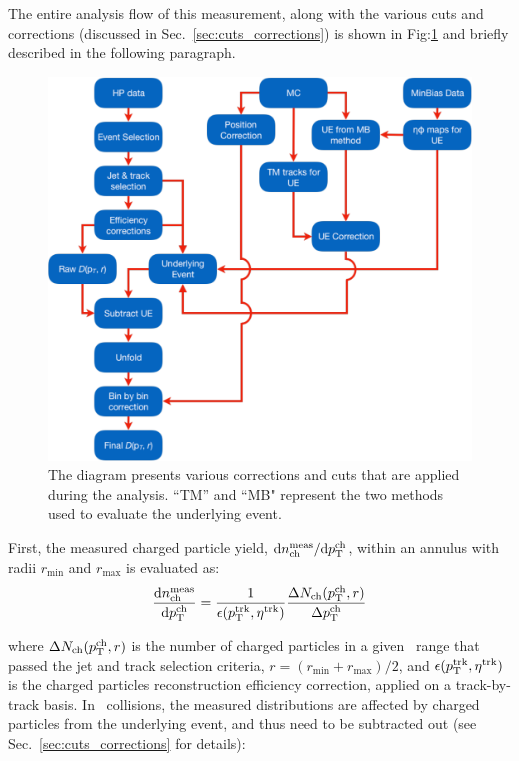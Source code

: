 The entire analysis flow of this measurement, along with the various cuts and corrections (discussed in Sec.~\ref{sec:cuts_corrections}) is shown in Fig:\ref{Fig:analysis_flow} and briefly described in the following paragraph.

\begin{figure}
\centerline{
\includegraphics[width=20.cm]{figures_general/Shape_analyses_flow.pdf}
}
\caption{The diagram presents various corrections and cuts that are applied during the analysis. ``TM'' and ``MB" represent the two methods used to evaluate the underlying event.}
\label{Fig:analysis_flow}
\end{figure}

First, the measured charged particle yield, $\text{d}n^{\text{meas}}_{\text{ch}}/\text{d}\mbox{$p_{{\mathrm{T}}}^{\mathrm{ch}}$}$, within an annulus with radii $r_{\text{min}}$ and $r_{\text{max}}$ is evaluated as:
\begin{equation}
\frac{\text{d}n^{\text{meas}}_{\text{ch}}}{\text{d}\pTch} = \frac{1}{\epsilon(\pttrk, \etatrk)} \frac{\Delta N_{\text{ch}} (\pTch, r)}{\Delta \pTch}
\end{equation}

where $\Delta N_{\text{ch}} (\mbox{$p_{{\mathrm{T}}}^{\mathrm{ch}}$}, r)$ is the number of charged particles in a given \pTch\ range that passed the jet and track selection criteria, $r = (r_{\text{min}} + r_{\text{max}}) / 2$, and $\epsilon(\pttrk, \etatrk)$ is the charged particles reconstruction efficiency correction, applied on a track-by-track basis. In \pbpb\ collisions, the measured distributions are affected by charged particles from the underlying event, and thus need to be subtracted out (see Sec.~\ref{sec:cuts_corrections} for details):

